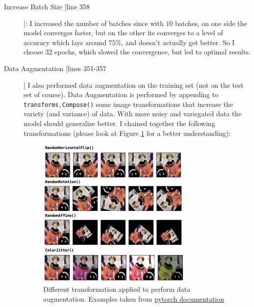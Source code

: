 \documentclass[a4paper]{article}
\begin{document}
\begin{enumerate}
\begin{description}
\item[Increase Batch Size [line 358]]: I increased the number of batches since with $10$ batches, on one side the model converges faster, but on the other its converges to a level of accuracy which lays around $75\%$, and doesn't actually get better. So I choose $32$ epochs, which slowed the convergence, but led to optimal results. 
\item[Data Augmentation [lines 351-357]] I also performed data augmentation on the training set (not on the test set of course). Data Augmentation is performed by appending to \texttt{transforms.Compose()} some image transformations that increase the variety (and variance) of data. With more noisy and variegated data the model should generalize better. I chained together the following transformations (please look at Figure \ref{fig:transf} for a better understanding):

        \begin{figure}[h]
            \centering
            \includegraphics[width=0.75\textwidth]{images/transformations.png}
            \caption{Different transformation applied to perform data augmentation. Examples taken from \href{https://pytorch.org/vision/main/auto_examples/transforms/plot_transforms_illustrations.html#sphx-glr-auto-examples-transforms-plot-transforms-illustrations-py}{pytorch documentation}}
            \label{fig:transf}
        \end{figure}


\end{description}
\end{enumerate}
\end{document}
